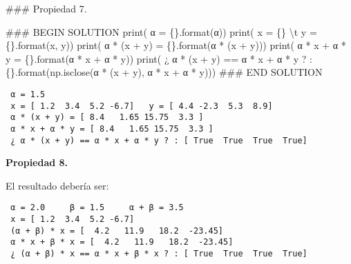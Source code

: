 \documentclass[
  letterpaper,
  DIV=11,
  numbers=noendperiod]{scrreprt}
\newenvironment{Shaded}{\begin{snugshade}}{\end{snugshade}}
\newcommand{\BuiltInTok}[1]{\textcolor[rgb]{0.00,0.23,0.31}{#1}}
\newcommand{\CharTok}[1]{\textcolor[rgb]{0.13,0.47,0.30}{#1}}
\newcommand{\CommentTok}[1]{\textcolor[rgb]{0.37,0.37,0.37}{#1}}
\newcommand{\NormalTok}[1]{\textcolor[rgb]{0.00,0.23,0.31}{#1}}
\newcommand{\OperatorTok}[1]{\textcolor[rgb]{0.37,0.37,0.37}{#1}}
\newcommand{\RegionMarkerTok}[1]{\textcolor[rgb]{0.00,0.23,0.31}{#1}}
\newcommand{\SpecialCharTok}[1]{\textcolor[rgb]{0.37,0.37,0.37}{#1}}
\newcommand{\StringTok}[1]{\textcolor[rgb]{0.13,0.47,0.30}{#1}}
\begin{document}
\begin{Shaded}
\begin{Highlighting}[]
\CommentTok{\#\#\# Propiedad 7.}

\CommentTok{\#\#\# }\RegionMarkerTok{BEGIN}\CommentTok{ SOLUTION}
\BuiltInTok{print}\NormalTok{(}\StringTok{\textquotesingle{} α = }\SpecialCharTok{\{\}}\StringTok{\textquotesingle{}}\NormalTok{.}\BuiltInTok{format}\NormalTok{(α))}
\BuiltInTok{print}\NormalTok{(}\StringTok{\textquotesingle{} x = }\SpecialCharTok{\{\}}\StringTok{ }\CharTok{\textbackslash{}t}\StringTok{ y = }\SpecialCharTok{\{\}}\StringTok{\textquotesingle{}}\NormalTok{.}\BuiltInTok{format}\NormalTok{(x, y))}
\BuiltInTok{print}\NormalTok{(}\StringTok{\textquotesingle{} α * (x + y) = }\SpecialCharTok{\{\}}\StringTok{\textquotesingle{}}\NormalTok{.}\BuiltInTok{format}\NormalTok{(α }\OperatorTok{*}\NormalTok{ (x }\OperatorTok{+}\NormalTok{ y)))}
\BuiltInTok{print}\NormalTok{(}\StringTok{\textquotesingle{} α * x + α * y = }\SpecialCharTok{\{\}}\StringTok{\textquotesingle{}}\NormalTok{.}\BuiltInTok{format}\NormalTok{(α }\OperatorTok{*}\NormalTok{ x }\OperatorTok{+}\NormalTok{ α }\OperatorTok{*}\NormalTok{ y))}
\BuiltInTok{print}\NormalTok{(}\StringTok{\textquotesingle{} ¿ α * (x + y) == α * x + α * y ? : }\SpecialCharTok{\{\}}\StringTok{\textquotesingle{}}\NormalTok{.}\BuiltInTok{format}\NormalTok{(np.isclose(α }\OperatorTok{*}\NormalTok{ (x }\OperatorTok{+}\NormalTok{ y), α }\OperatorTok{*}\NormalTok{ x }\OperatorTok{+}\NormalTok{ α }\OperatorTok{*}\NormalTok{ y)))}
\CommentTok{\#\#\# }\RegionMarkerTok{END}\CommentTok{ SOLUTION}
\end{Highlighting}
\end{Shaded}

\begin{verbatim}
 α = 1.5
 x = [ 1.2  3.4  5.2 -6.7]   y = [ 4.4 -2.3  5.3  8.9]
 α * (x + y) = [ 8.4   1.65 15.75  3.3 ]
 α * x + α * y = [ 8.4   1.65 15.75  3.3 ]
 ¿ α * (x + y) == α * x + α * y ? : [ True  True  True  True]
\end{verbatim}

\textbf{Propiedad 8.}

El resultado debería ser:

\begin{verbatim}
 α = 2.0     β = 1.5     α + β = 3.5
 x = [ 1.2  3.4  5.2 -6.7]
 (α + β) * x = [  4.2   11.9   18.2  -23.45]
 α * x + β * x = [  4.2   11.9   18.2  -23.45]
 ¿ (α + β) * x == α * x + β * x ? : [ True  True  True  True]
\end{verbatim}
\end{document}
